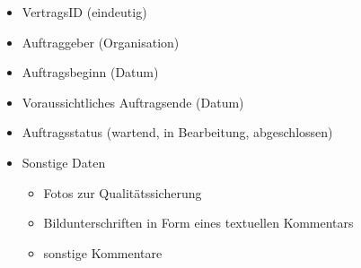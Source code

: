  \begin{itemize}
\item VertragsID (eindeutig)
\item Auftraggeber (Organisation)
\item Auftragsbeginn (Datum)
\item Voraussichtliches Auftragsende (Datum)
\item Auftragsstatus  (wartend,  in Bearbeitung,  abgeschlossen)
\item Sonstige Daten
	 \begin{itemize}
 	\item Fotos zur Qualit\"atssicherung 
 	\item Bildunterschriften in Form eines textuellen Kommentars
 	\item sonstige Kommentare
 	\end{itemize}
\end{itemize}


